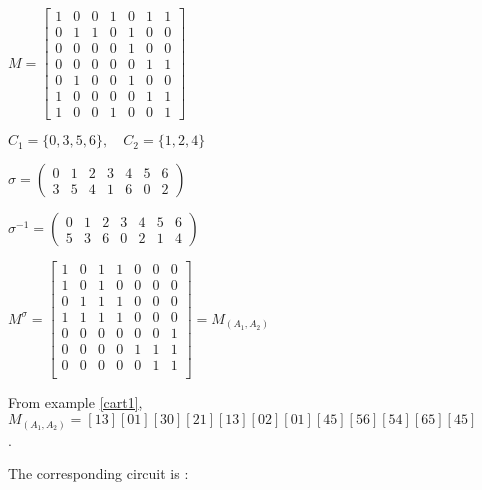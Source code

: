 \documentclass[a4paper,12pt,fleqn]{article}
\begin{document}
\begin{figure}
\begin{minipage}[t]{.4\linewidth}
$M=\begin{bmatrix}
1&0&0&1&0&1&1\\
0&1&1&0&1&0&0\\
0&0&0&0&1&0&0\\
0&0&0&0&0&1&1\\
0&1&0&0&1&0&0\\
1&0&0&0&0&1&1\\
1&0&0&1&0&0&1
\end{bmatrix}$
\end{minipage}
\begin{minipage}[c]{.6\linewidth}
  $C_1=\{0,3,5,6\},\quad C_2=\{1,2,4\}$\medskip
  
  $ \sigma=\begin{pmatrix}0&1&2&3&4&5&6\\3&5&4&1&6&0&2\end{pmatrix}$\medskip

  $ \sigma^{-1}=\begin{pmatrix}0&1&2&3&4&5&6\\5&3&6&0&2&1&4\end{pmatrix}$
\end{minipage}
$M^{\sigma}=\begin{bmatrix}
   1&0&1&1&0&0&0\\
   1&0&1&0&0&0&0\\
   0&1&1&1&0&0&0\\
   1&1&1&1&0&0&0\\
   0&0&0&0&0&0&1\\
   0&0&0&0&1&1&1\\
   0&0&0&0&0&1&1\\
 \end{bmatrix}=M_{(A_1,A_2)}$


 From example \ref{cart1}, $M_{(A_1,A_2)}=[13][01][30][21][13][02][01][45][56][54][65][45]$.

 The corresponding circuit is :
 

\end{figure}
\end{document}
